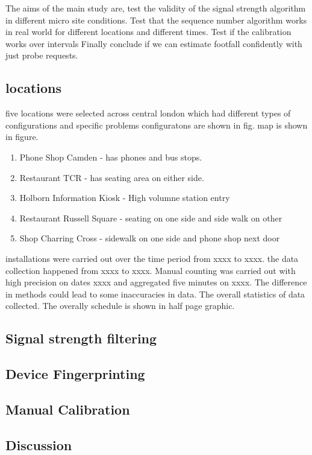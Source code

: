 The aims of the main study are,
test the validity of the signal strength algorithm in different 
micro site conditions.
Test that the sequence number algorithm works in real world
for different locations and different times.
Test if the calibration works over intervals
Finally conclude if we can estimate footfall confidently
with just probe requests.

\subsection{locations}
five locations were selected across central london which
had different types of configurations and specific problems
configuratons are shown in fig. map is shown in figure.
\begin{enumerate}
	\item Phone Shop Camden - has phones and bus stops.
	\item Restaurant TCR - has seating area on either side.
	\item Holborn Information Kiosk - High volumne station entry
	\item Restaurant Russell Square - seating on one side and side walk on other
	\item Shop Charring Cross - sidewalk on one side and phone shop next door
\end{enumerate}
installations were carried out over the time period from xxxx to xxxx.
the data collection happened from xxxx to xxxx. Manual counting was carried out
with high precision on dates xxxx and aggregated five minutes on xxxx.
The difference in methods could lead to some inaccuracies in data.
The overall statistics of data collected. 
The overally schedule is shown in half page graphic.

\subsection{Signal strength filtering}

\subsection{Device Fingerprinting}

\subsection{Manual Calibration}

\subsection{Discussion}
